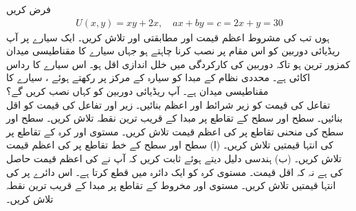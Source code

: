 فرض کریں 
\begin{align*}
U(x,y)=xy+2x, \quad ax+by=c=2x+y=30
\end{align*}
ہوں تب  کی مشروط  اعظم قیمت  اور مطابقتی  اور  تلاش کریں۔
ایک  سیارے پر آپ   ریڈیائی دوربین  کو اس مقام پر نصب کرنا چاہتے ہو جہاں  سیارے کا مقناطیسی میدان کمزور ترین ہو   تاکہ دوربین کی کارکردگی میں خلل اندازی اقل  ہو۔ اس سیارے  کا رداس  اکائی ہے۔ محددی نظام کے مبدا کو سیارہ کے مرکز پر  رکھتے ہوئے ، سیارے   کا  مقناطیسی میدان  ہے۔ آپ ریڈیائی دوربین کو کہاں نصب کریں گے؟
\\
تفاعل  کی قیمت کو  زیر  شرائط  اور  اعظم بنائیں۔ 
  زیر    اور تفاعل  کی قیمت کو اقل   بنائیں۔ 
سطح  اور سطح   کے تقاطع  پر مبدا کے قریب ترین  نقطہ تلاش کریں۔
سطح  اور سطح   کی منحنی تقاطع  پر  کی اعظم قیمت تلاش کریں۔
مستوی  اور کرہ  کے تقاطع پر  کی انتہا  قیمتیں تلاش کریں۔
(ا) سطح  اور سطح  کے خط تقاطع پر    کی اعظم قیمت تلاش کریں۔  (ب)  ہندسی دلیل دیتے ہوئے ثابت کریں کہ آپ نے   کی اعظم قیمت حاصل کی ہے نہ کہ  اقل قیمت۔
مستوی  کرہ  کو ایک دائرہ میں قطع کرتا ہے۔ اس دائرے  پر   کی انتہا قیمتیں تلاش کریں۔
مستوی   اور  مخروط  کے تقاطع پر مبدا کے قریب ترین نقطہ تلاش کریں۔
